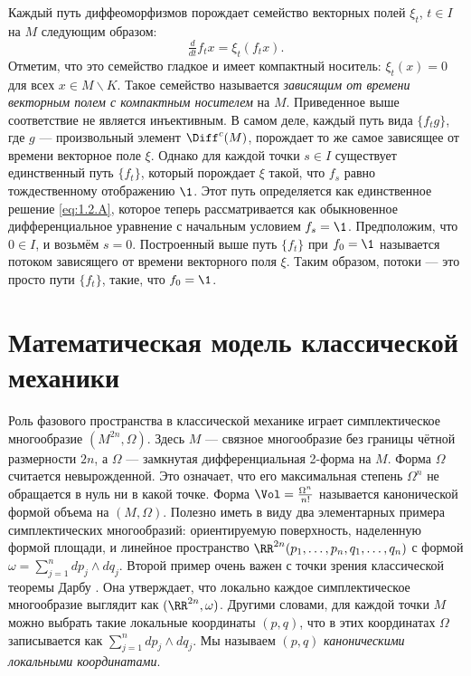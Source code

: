 Каждый путь диффеоморфизмов порождает семейство векторных полей $\xi_t$, $t \in I$ на $M$ следующим образом: 
\begin{equation}\tfrac{d}{dt} f_t x = \xi_t (f_t x).
\label{eq:1.2.A}
\end{equation}
Отметим, что это семейство гладкое и имеет компактный носитель: $\xi_t (x) = 0$ для всех $x \in M \backslash K$.
Такое семейство называется \emph{зависящим от времени векторным полем с компактным носителем} на $M$.
Приведенное выше соответствие не является инъективным.
В самом деле, каждый путь вида $\{f_t g\}$, где $g$ --- произвольный элемент $\Diff^c (M)$, порождает то же самое зависящее от времени векторное поле $\xi$.
Однако для каждой точки $s \in I$ существует единственный путь $\{f_t\}$, который 
порождает $\xi$ такой, что $f_s$ равно тождественному отображению $\1$.
Этот путь определяется как единственное решение \ref{eq:1.2.A}, которое теперь рассматривается как обыкновенное дифференциальное уравнение с начальным условием $f_s = \1$.
Предположим, что $0 \in I$, и возьмём $s = 0$.
Построенный выше путь $\{f_t\}$ при $f_0 = \1$ называется потоком зависящего от времени векторного поля $\xi$.
Таким образом, потоки --- это просто пути $\{f_t\}$, такие, что $f_0 = \1$.

\section{Математическая модель классической механики}

Роль фазового пространства в классической механике играет симплектическое многообразие $(M^{2n},\Omega)$.
Здесь $M$ --- связное многообразие без границы чётной размерности $2n$, а $\Omega$ --- замкнутая дифференциальная 2-форма на $M$.
Форма $\Omega$ считается невырожденной.
Это означает, что его максимальная степень $\Omega^n$ не обращается в нуль ни в какой точке.
Форма $\Vol =  \tfrac{\Omega^n}{n!}$ называется канонической формой объема на $(M, \Omega)$.
Полезно иметь в виду два элементарных примера симплектических многообразий:
ориентируемую поверхность, наделенную формой площади, и линейное пространство $\RR^{2n} (p_1,\dots, p_n, q_1,\dots, q_n)$ с формой $\omega = \sum^n_{j = 1} dp_j \wedge dq_j$.
Второй пример очень важен с точки зрения классической теоремы Дарбу \cite{MS}.
Она утверждает, что локально каждое симплектическое многообразие выглядит как $(\RR^{2n}, \omega)$.
Другими словами, для каждой точки $M$ можно выбрать такие локальные координаты $(p, q)$, что в этих координатах $\Omega$ записывается как $\sum^n_{j = 1} dp_j \wedge dq_j$.
Мы называем $(p, q)$ \emph{каноническими локальными координатами}.

